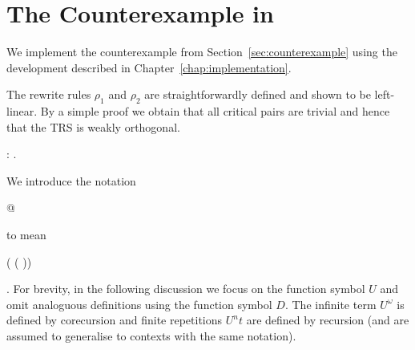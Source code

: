 \section{The Counterexample in \Coq}

We implement the counterexample from Section~\ref{sec:counterexample}
using the \Coq development described in
Chapter~\ref{chap:implementation}.

The rewrite rules $\rho_1$ and $\rho_2$ are straightforwardly defined
and shown to be left-linear. By a simple proof we obtain that all
critical pairs are trivial and hence that the TRS is weakly
orthogonal.
\begin{singlespace}
\begin{coqdoccode}
\coqdocnoindent
{}
 :
{}.\coqdoceol
\end{coqdoccode}
\end{singlespace}
We introduce the notation \begin{coqdoccode} @
  \end{coqdoccode} to mean
\begin{coqdoccode}
   ( 
  (
  ))\end{coqdoccode}.
For brevity, in the following discussion we focus on the function symbol $U$
and omit analoguous definitions using the function symbol $D$.
The infinite term $U^\omega$ is defined
by corecursion and finite repetitions $U^n t$ are defined by recursion
(and are assumed to generalise to contexts with the same notation).
